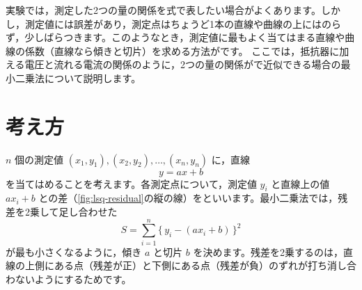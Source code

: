 

実験では，測定した2つの量の関係を式で表したい場合がよくあります。しかし，測定値には誤差があり，測定点はちょうど1本の直線や曲線の上にはのらず，少しばらつきます。このようなとき，測定値に最もよく当てはまる直線や曲線の係数（直線なら傾きと切片）を求める方法がです。
ここでは，抵抗器に加える電圧と流れる電流の関係のように，2つの量の関係がで近似できる場合の最小二乗法について説明します。

\section{考え方}

$n$ 個の測定値 $(x_1, y_1), (x_2, y_2), \dots, (x_n, y_n)$ に，直線
\begin{equation}
  y = ax + b
  \label{eq:lsq-line}
\end{equation}
を当てはめることを考えます。各測定点について，測定値 $y_i$ と直線上の値 $ax_i+b$ との差（\cref{fig:lsq-residual}の縦の線）をといいます。最小二乗法では，残差を2乗して足し合わせた
\begin{equation}
  S = \sum_{i=1}^{n} \{\,y_i - (ax_i + b)\,\}^2
  \label{eq:lsq-s}
\end{equation}
が最も小さくなるように，傾き $a$ と切片 $b$ を決めます。残差を2乗するのは，直線の上側にある点（残差が正）と下側にある点（残差が負）のずれが打ち消し合わないようにするためです。

